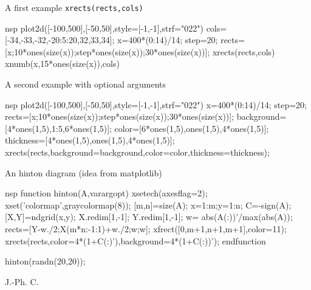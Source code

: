 \begin{examples}

\noindent A first example \verb!xrects(rects,cols)!

\begin{mintednsp}{nsp}
  plot2d([-100,500],[-50,50],style=[-1,-1],strf="022")
  cols=[-34,-33,-32,-20:5:20,32,33,34];
  x=400*(0:14)/14; step=20;
  rects=[x;10*ones(size(x));step*ones(size(x));30*ones(size(x))];
  xrects(rects,cols)
  xnumb(x,15*ones(size(x)),cols)
\end{mintednsp}

\noindent A second example with optional arguments

\begin{mintednsp}{nsp}
  plot2d([-100,500],[-50,50],style=[-1,-1],strf="022")
  x=400*(0:14)/14; step=20;
  rects=[x;10*ones(size(x));step*ones(size(x));30*ones(size(x))];
  background=[4*ones(1,5),1:5,6*ones(1,5)];
  color=[6*ones(1,5),ones(1,5),4*ones(1,5)];
  thickness=[4*ones(1,5),ones(1,5),4*ones(1,5)];
  xrects(rects,background=background,color=color,thickness=thickness);
\end{mintednsp}

\noindent An hinton diagram (idea from matplotlib)

\begin{mintednsp}{nsp}
function hinton(A,varargopt)
  xsetech(axesflag=2);
  xset('colormap',graycolormap(8));
  [m,n]=size(A);
  x=1:m;y=1:n;  C=-sign(A);
  [X,Y]=ndgrid(x,y);
  X.redim[1,-1]; Y.redim[1,-1];
  w=  abs(A(:))'/max(abs(A));
  rects=[Y-w./2;X(m*n:-1:1)+w./2;w;w];
  xfrect([0,m+1,n+1,m+1],color=11);
  xrects(rects,color=4*(1+C(:)'),background=4*(1+C(:))');
endfunction

hinton(randn(20,20));
\end{mintednsp}

\end{examples}
\begin{manseealso}
   
\end{manseealso}
\begin{authors}
  J.-Ph. C.
\end{authors}
